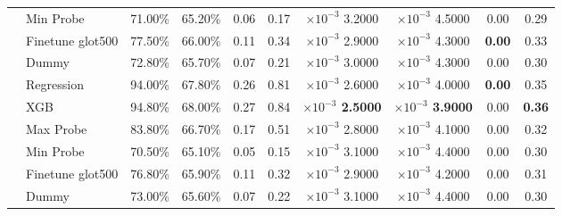 \begin{tabular}{ll||cccccccc}
	                         & Min Probe        & 71.00\%                       & 65.20\%           & 0.06           & \multicolumn{1}{c|}{0.17}           & $\times 10^{-3}$ 3.2000           & $\times 10^{-3}$ 4.5000           & 0.00           & 0.29          \\
	                         & Finetune glot500 & 77.50\%                       & 66.00\%           & 0.11           & \multicolumn{1}{c|}{0.34}           & $\times 10^{-3}$ 2.9000           & $\times 10^{-3}$ 4.3000           & \bfseries 0.00 & 0.33          \\\hhline{*{10}{-}}
	\multirow{6}{*}{German}  & Dummy            & 72.80\%                       & 65.70\%           & 0.07           & \multicolumn{1}{c|}{0.21}           & $\times 10^{-3}$ 3.0000           & $\times 10^{-3}$ 4.3000           & 0.00           & 0.30          \\
	                         & Regression       & 94.00\%                       & 67.80\%           & 0.26           & \multicolumn{1}{c|}{0.81}           & $\times 10^{-3}$ 2.6000           & $\times 10^{-3}$ 4.0000           & \bfseries 0.00 & 0.35          \\
	                         & XGB              & 94.80\%                       & 68.00\%           & 0.27           & \multicolumn{1}{c|}{0.84}           & \bfseries $\times 10^{-3}$ 2.5000 & \bfseries $\times 10^{-3}$ 3.9000 & 0.00           & \bfseries 0.36\\
	                         & Max Probe        & 83.80\%                       & 66.70\%           & 0.17           & \multicolumn{1}{c|}{0.51}           & $\times 10^{-3}$ 2.8000           & $\times 10^{-3}$ 4.1000           & 0.00           & 0.32          \\
	                         & Min Probe        & 70.50\%                       & 65.10\%           & 0.05           & \multicolumn{1}{c|}{0.15}           & $\times 10^{-3}$ 3.1000           & $\times 10^{-3}$ 4.4000           & 0.00           & 0.30          \\
	                         & Finetune glot500 & 76.80\%                       & 65.90\%           & 0.11           & \multicolumn{1}{c|}{0.32}           & $\times 10^{-3}$ 2.9000           & $\times 10^{-3}$ 4.2000           & 0.00           & 0.31          \\\hhline{*{10}{-}}
	\multirow{6}{*}{Russian} & Dummy            & 73.00\%                       & 65.60\%           & 0.07           & \multicolumn{1}{c|}{0.22}           & $\times 10^{-3}$ 3.1000           & $\times 10^{-3}$ 4.4000           & 0.00           & 0.30          \\

\end{tabular}

